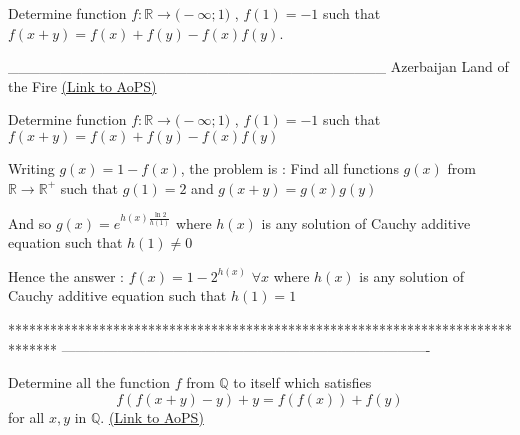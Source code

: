 \begin{problem}
	Determine function ${f: \mathbb{R}\to\mathbb(-\infty;1)}$  , $f(1)=-1$ such that $f(x+y)=f(x)+f(y)-f(x)f(y)$.


____________________________________
Azerbaijan Land of the Fire 
	\flushright \href{https://artofproblemsolving.com/community/c6h478824}{(Link to AoPS)}
\end{problem}



\begin{solution}
	\begin{tcolorbox}Determine function ${f: \mathbb{R}\to\mathbb(-\infty;1)}$  , $f(1)=-1$ such that $f(x+y)=f(x)+f(y)-f(x)f(y)$\end{tcolorbox}
Writing $g(x)=1-f(x)$, the problem is :
Find all functions $g(x)$ from $\mathbb R\to\mathbb R^+$ such that $g(1)=2$ and $g(x+y)=g(x)g(y)$

And so $g(x)=e^{h(x)\frac{\ln 2}{h(1)}}$ where $h(x)$ is any solution of Cauchy additive equation such that $h(1)\ne 0$

Hence the answer : $\boxed{f(x)=1-2^{h(x)}}$ $\forall x$ where $h(x)$ is any solution of Cauchy additive equation such that $h(1)=1$
\end{solution}
*******************************************************************************
-------------------------------------------------------------------------------

\begin{problem}
	Determine all the function $f$ from $\mathbb{Q}$ to itself which satisfies\[f(f(x+y)-y)+y=f(f(x))+f(y)\]for all $x,y$ in $\mathbb{Q}$.
	\flushright \href{https://artofproblemsolving.com/community/c6h478852}{(Link to AoPS)}
\end{problem}



